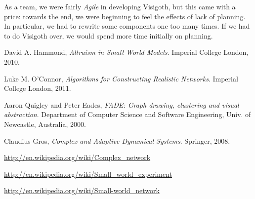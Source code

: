 \documentclass[a4paper,11pt,titlepage]{article}
\newcommand{\buzz}[1]{\emph{#1}}
\begin{document}
As a team, we were fairly \buzz{Agile} in developing Visigoth, but
this came with a price: towards the end, we were beginning to feel the
effects of lack of planning. In particular, we had to rewrite some
components one too many times. If we had to do Visigoth over, we would
spend more time initially on planning.

\begin{thebibliography}{9}

  David A. Hammond,
  \emph{Altruism in Small World Models}.
  Imperial College London,
  2010.

  Luke M. O'Connor,
  \emph{Algorithms for Constructing Realistic Networks}.
  Imperial College London,
  2011.

  Aaron Quigley and Peter Eades,
  \emph{FADE: Graph drawing, clustering and visual abstraction}.
  Department of Computer Science and Software Engineering,
  Univ. of  Newcastle, Australia, 2000.

Claudius Gros,
\emph{Complex and Adaptive Dynamical Systems}.
Springer,
2008.

  \url{http://en.wikipedia.org/wiki/Complex_network}

 \url{http://en.wikipedia.org/wiki/Small_world_experiment}

 \url{http://en.wikipedia.org/wiki/Small-world_network}

\end{thebibliography}
\end{document}
